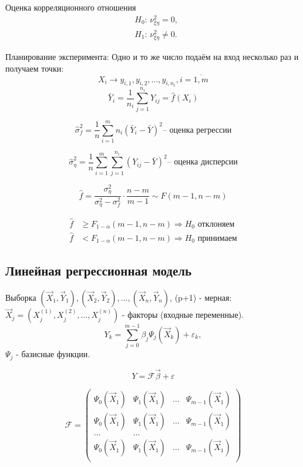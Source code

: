 Оценка корреляционного отношения
\begin{align*}
  &H_0\text{: } \nu_{\xi\eta}^2 = 0, \\
  &H_1\text{: } \nu_{\xi\eta}^2 \neq 0.
\end{align*}

Планирование эксперимента:
Одно и то же число подаём на вход несколько раз и получаем точки:
\[
  X_i \rightarrow y_{i,1}, y_{i,2}, \dots, y_{i, n_i}, i = \overline{1, m}
\]
\[
  \bar Y_i = \frac{1}{n_i} \sum_{j=1}^{n_i} Y_{ij} = \hat f(X_i)
\]

\[
  \hat\sigma_f^2 = \frac{1}{n} \sum_{i=1}^m n_i (\bar Y_i - \bar Y)^2
  \text{-- оценка регрессии}
\]

\[
  \hat\sigma_\eta^2 = \frac{1}{n} \sum_{i=1}^m \sum_{j=1}^{n_i} (Y_{ij} - \bar Y)^2
  \text{-- оценка дисперсии}
\]

\[
  \hat f = \frac{\sigma_\eta^2}{\sigma_\eta^2 - \sigma_f^2} \cdot \frac{n-m}{m-1}
  \sim F(m-1, n-m)
\]

\begin{align*}
  \hat f &\geqslant F_{1-\alpha} (m-1, n-m) \Rightarrow \text{$H_0$ отклоняем} \\
  \hat f &< F_{1-\alpha} (m-1, n-m) \Rightarrow \text{$H_0$ принимаем}
\end{align*}

\subsection{Линейная регрессионная модель}

Выборка $(\vec{X}_1, \vec{Y}_1), (\vec{X}_2, \vec{Y}_2), \dots, (\vec{X}_n, \vec{Y}_n)$, 
(p+1) - мерная: $\vec{X}_j = (X_j^{(1)}, X_j^{(2)}, \dots, X_j^{(n)})$ - факторы (входные переменные).
\[
  Y_k = \sum_{j=0}^{m-1} \beta_j \Psi_j(\vec{X}_k) + \varepsilon_k,
\]
$\Psi_j$ - базисные функции.

\[
  Y = \mathcal{F} \vec{\beta} + \varepsilon
\]

\[
  \mathcal{F} = \begin{pmatrix}
    \Psi_0(\vec{X}_1) & \Psi_1(\vec{X}_1) & \dots & \Psi_{m-1} (\vec{X}_1) \\
    \Psi_0(\vec{X}_1) & \Psi_1(\vec{X}_1) & \dots & \Psi_{m-1} (\vec{X}_1) \\
    \dots & \dots \\
    \Psi_0(\vec{X}_1) & \Psi_1(\vec{X}_1) & \dots & \Psi_{m-1} (\vec{X}_1) \\
  \end{pmatrix}
\]

